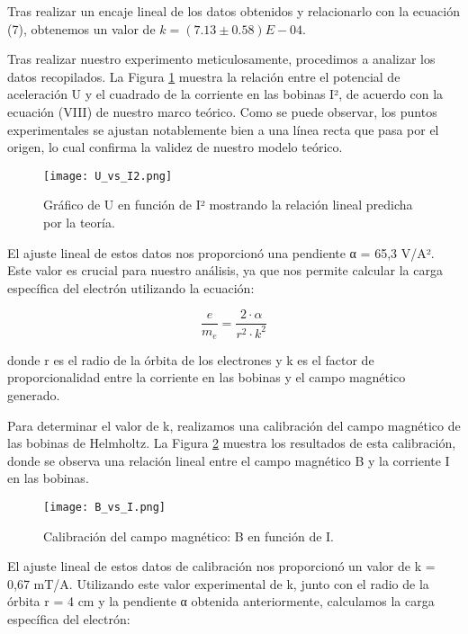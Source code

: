 \documentclass[twocolumn,a4paper,11pt]{scrartcl}
\begin{document}
Tras realizar un encaje lineal de los datos obtenidos y relacionarlo con la ecuación (7), obtenemos un valor de $k =  (7.13 \pm 0.58) E-04$.




Tras realizar nuestro experimento meticulosamente, procedimos a analizar los datos recopilados. La Figura \ref{fig:U_vs_I2} muestra la relación entre el potencial de aceleración U y el cuadrado de la corriente en las bobinas I², de acuerdo con la ecuación (VIII) de nuestro marco teórico. Como se puede observar, los puntos experimentales se ajustan notablemente bien a una línea recta que pasa por el origen, lo cual confirma la validez de nuestro modelo teórico.

\begin{figure}[h]
    \centering
    \texttt{[image: U\_vs\_I2.png]}
    \caption{Gráfico de U en función de I² mostrando la relación lineal predicha por la teoría.}
    \label{fig:U_vs_I2}
\end{figure}

El ajuste lineal de estos datos nos proporcionó una pendiente α = 65,3 V/A². Este valor es crucial para nuestro análisis, ya que nos permite calcular la carga específica del electrón utilizando la ecuación:

\begin{equation}
\frac{e}{m_e} = \frac{2 \cdot \alpha}{r^2 \cdot k^2}
\end{equation}

donde r es el radio de la órbita de los electrones y k es el factor de proporcionalidad entre la corriente en las bobinas y el campo magnético generado.

Para determinar el valor de k, realizamos una calibración del campo magnético de las bobinas de Helmholtz. La Figura \ref{fig:B_vs_I} muestra los resultados de esta calibración, donde se observa una relación lineal entre el campo magnético B y la corriente I en las bobinas.

\begin{figure}[h]
    \centering
    \texttt{[image: B\_vs\_I.png]}
    \caption{Calibración del campo magnético: B en función de I.}
    \label{fig:B_vs_I}
\end{figure}

El ajuste lineal de estos datos de calibración nos proporcionó un valor de k = 0,67 mT/A. Utilizando este valor experimental de k, junto con el radio de la órbita r = 4 cm y la pendiente α obtenida anteriormente, calculamos la carga específica del electrón:
\end{document}
